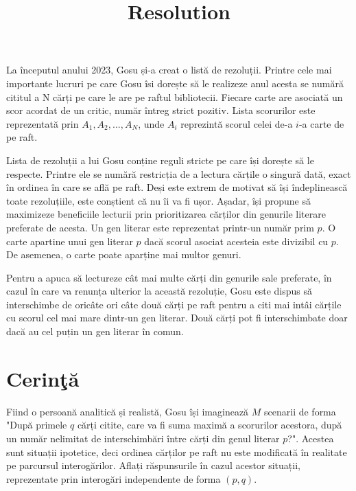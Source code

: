 \documentclass[ro]{problem}
\title{Resolution}
\begin{document}
\maketitle

La începutul anului 2023, Gosu și-a creat o listă de rezoluții. Printre cele mai importante lucruri pe care Gosu îsi dorește să le realizeze anul acesta se numără cititul a N cărți pe care le are pe raftul bibliotecii. Fiecare carte are asociată un scor acordat de un critic, număr întreg strict pozitiv. Lista scorurilor este reprezentată prin $A_1, A_2, ..., A_N$, unde $A_i$ reprezintă scorul celei de-a $i$-a carte de pe raft.

\par

Lista de rezoluții a lui Gosu conține reguli stricte pe care își dorește să le respecte. Printre ele se numără restricția de a lectura cărțile o singură dată, exact în ordinea în care se află pe raft. Deși este extrem de motivat să își îndeplinească toate rezoluțiile, este conștient că nu îi va fi ușor. Așadar, își propune să maximizeze beneficiile lecturii prin prioritizarea cărților din genurile literare preferate de acesta. Un gen literar este reprezentat printr-un număr prim $p$. O carte apartine unui gen literar $p$ dacă scorul asociat acesteia este divizibil cu $p$. De asemenea, o carte poate aparține mai multor genuri.

\par

Pentru a apuca să lectureze cât mai multe cărți din genurile sale preferate, în cazul în care va renunța ulterior la această rezoluție, Gosu este dispus să interschimbe de oricâte ori câte două cărți pe raft pentru a citi mai intâi cărțile cu scorul cel mai mare dintr-un gen literar. Două cărți pot fi interschimbate doar dacă au cel puțin un gen literar în comun.

 \section{Cerinţă}

 Fiind o persoană analitică și realistă, Gosu își imaginează $M$ scenarii de forma "După primele $q$ cărți citite, care va fi suma maximă a scorurilor acestora, după un număr nelimitat de interschimbări între cărți din genul literar $p$?". Acestea sunt situații ipotetice, deci ordinea cărților pe raft nu este modificată în realitate pe parcursul interogărilor. Aflați răspunsurile în cazul acestor situații, reprezentate prin interogări independente de forma $(p, q)$.
 
\end{document}
